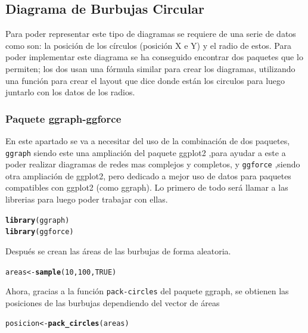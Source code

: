 \documentclass{article}\usepackage[]{graphicx}\usepackage[]{color}
\makeatletter
\newcommand{\hlnum}[1]{\textcolor[rgb]{0.686,0.059,0.569}{#1}}%
\newcommand{\hlstd}[1]{\textcolor[rgb]{0.345,0.345,0.345}{#1}}%
\newcommand{\hlkwb}[1]{\textcolor[rgb]{0.69,0.353,0.396}{#1}}%
\newcommand{\hlkwd}[1]{\textcolor[rgb]{0.737,0.353,0.396}{\textbf{#1}}}%
\newenvironment{kframe}{%
 \def\at@end@of@kframe{}%
 \ifinner\ifhmode%
  \def\at@end@of@kframe{\end{minipage}}%
  \begin{minipage}{\columnwidth}%
 \fi\fi%
 \def\FrameCommand##1{\hskip\@totalleftmargin \hskip-\fboxsep
 \colorbox{shadecolor}{##1}\hskip-\fboxsep
     \hskip-\linewidth \hskip-\@totalleftmargin \hskip\columnwidth}%
 \MakeFramed {\advance\hsize-\width
   \@totalleftmargin\z@ \linewidth\hsize
   \@setminipage}}%
 {\par\unskip\endMakeFramed%
 \at@end@of@kframe}
\newenvironment{knitrout}{}{} %
\makeatother
\begin{document}
\subsection{Diagrama de Burbujas Circular}\label{ssec:burbujas}
Para poder representar este tipo de diagramas se requiere de una serie de datos como son: la posici\'on de los c\'irculos (posici\'on X e Y) y el radio de estos. Para poder implementar este diagrama se ha conseguido encontrar dos paquetes que lo permiten; los dos usan una f\'ormula similar para crear los diagramas, utilizando una funci\'on para crear el layout que dice donde est\'an los circulos para luego juntarlo con los datos de los radios.
\subsubsection{Paquete ggraph-ggforce}
En este apartado se va a necesitar del uso de la combinaci\'on de dos paquetes, \texttt{ggraph} %
siendo este una ampliaci\'on del paquete ggplot2 %
,para ayudar a este a poder realizar diagramas de redes mas complejos y completos, y \texttt{ggforce} %
,siendo otra ampliaci\'on de ggplot2, pero dedicado a mejor uso de datos para paquetes compatibles con ggplot2 (como ggraph).
Lo primero de todo ser\'a llamar a las librerias para luego poder trabajar con ellas.
\begin{knitrout}
\color{fgcolor}\begin{kframe}
\begin{alltt}
\hlkwd{library}\hlstd{(ggraph)}
\hlkwd{library}\hlstd{(ggforce)}
\end{alltt}
\end{kframe}
\end{knitrout}
Despu\'es se crean las \'areas de las burbujas de forma aleatoria.
\begin{knitrout}
\color{fgcolor}\begin{kframe}
\begin{alltt}
\hlstd{areas} \hlkwb{<-} \hlkwd{sample}\hlstd{(}\hlnum{10}\hlstd{,} \hlnum{100}\hlstd{,} \hlnum{TRUE}\hlstd{)}
\end{alltt}
\end{kframe}
\end{knitrout}
Ahora, gracias a la funci\'on \texttt{pack-circles} del paquete ggraph, se obtienen las posiciones de las burbujas dependiendo del vector de \'areas
\begin{knitrout}
\color{fgcolor}\begin{kframe}
\begin{alltt}
\hlstd{posicion} \hlkwb{<-} \hlkwd{pack_circles}\hlstd{(areas)}
\end{alltt}
\end{kframe}
\end{knitrout}
\end{document}
